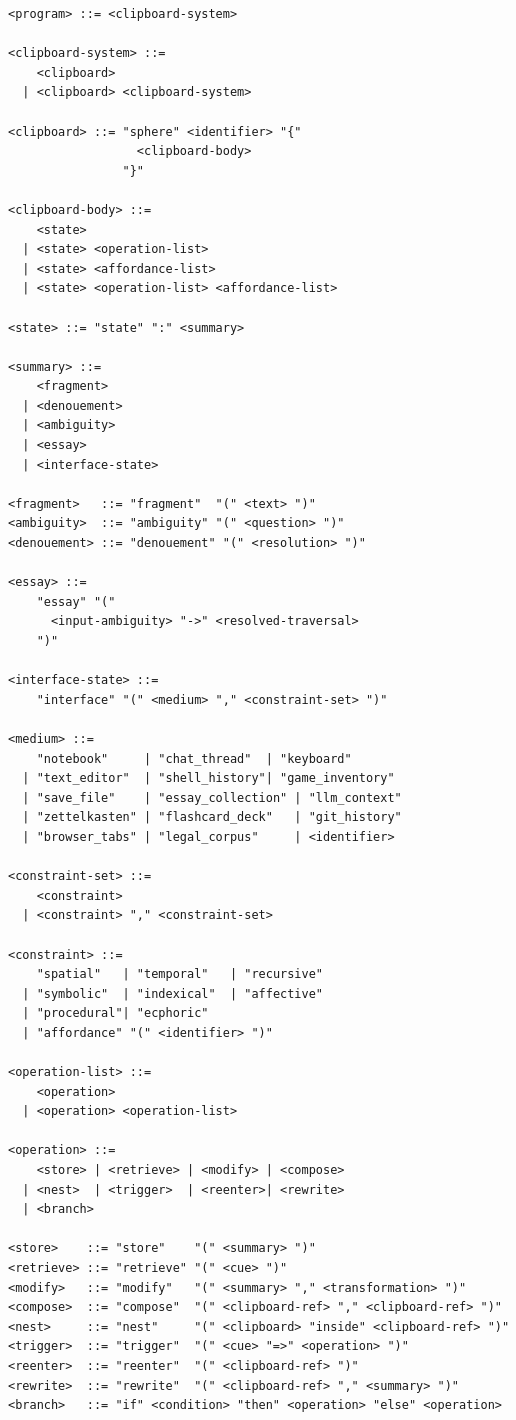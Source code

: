 \documentclass[12pt,oneside]{book}
\theoremstyle{plain}
\theoremstyle{definition}
\theoremstyle{plain}
\begin{document}
\begin{lstlisting}
<program> ::= <clipboard-system>

<clipboard-system> ::=
    <clipboard>
  | <clipboard> <clipboard-system>

<clipboard> ::= "sphere" <identifier> "{"
                  <clipboard-body>
                "}"

<clipboard-body> ::=
    <state>
  | <state> <operation-list>
  | <state> <affordance-list>
  | <state> <operation-list> <affordance-list>

<state> ::= "state" ":" <summary>

<summary> ::=
    <fragment>
  | <denouement>
  | <ambiguity>
  | <essay>
  | <interface-state>

<fragment>   ::= "fragment"  "(" <text> ")"
<ambiguity>  ::= "ambiguity" "(" <question> ")"
<denouement> ::= "denouement" "(" <resolution> ")"

<essay> ::=
    "essay" "("
      <input-ambiguity> "->" <resolved-traversal>
    ")"

<interface-state> ::=
    "interface" "(" <medium> "," <constraint-set> ")"

<medium> ::=
    "notebook"     | "chat_thread"  | "keyboard"
  | "text_editor"  | "shell_history"| "game_inventory"
  | "save_file"    | "essay_collection" | "llm_context"
  | "zettelkasten" | "flashcard_deck"   | "git_history"
  | "browser_tabs" | "legal_corpus"     | <identifier>

<constraint-set> ::=
    <constraint>
  | <constraint> "," <constraint-set>

<constraint> ::=
    "spatial"   | "temporal"   | "recursive"
  | "symbolic"  | "indexical"  | "affective"
  | "procedural"| "ecphoric"
  | "affordance" "(" <identifier> ")"

<operation-list> ::=
    <operation>
  | <operation> <operation-list>

<operation> ::=
    <store> | <retrieve> | <modify> | <compose>
  | <nest>  | <trigger>  | <reenter>| <rewrite>
  | <branch>

<store>    ::= "store"    "(" <summary> ")"
<retrieve> ::= "retrieve" "(" <cue> ")"
<modify>   ::= "modify"   "(" <summary> "," <transformation> ")"
<compose>  ::= "compose"  "(" <clipboard-ref> "," <clipboard-ref> ")"
<nest>     ::= "nest"     "(" <clipboard> "inside" <clipboard-ref> ")"
<trigger>  ::= "trigger"  "(" <cue> "=>" <operation> ")"
<reenter>  ::= "reenter"  "(" <clipboard-ref> ")"
<rewrite>  ::= "rewrite"  "(" <clipboard-ref> "," <summary> ")"
<branch>   ::= "if" <condition> "then" <operation> "else" <operation>


\end{lstlisting}
\end{document}

